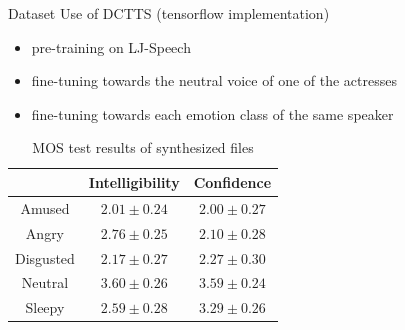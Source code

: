 \documentclass[final]{beamer}
\newlength{\onecolwid}
\newlength{\twocolwid}
\newcommand{\fatskip}{\vspace{3cm}}
\begin{document}
\begin{frame}[t]
\begin{columns}[t]
\begin{column}{\onecolwid}
\begin{block}{Dataset}
Use of DCTTS (tensorflow implementation)
\begin{itemize}
    \item pre-training on LJ-Speech
    \item fine-tuning towards the neutral voice of one of the actresses
    \item fine-tuning towards each emotion class of the same speaker
\end{itemize}



\end{block}




\fatskip\fatskip
\begin{table}[h]

\label{mos_synth}
\begin{center}
\begin{tabular}{|c|c|c|}
\hline
 & Intelligibility & Confidence\\
\hline
Amused & $2.01 \pm 0.24$ & $2.00 \pm 0.27$
\\ 
Angry & $2.76 \pm 0.25$ & $2.10 \pm 0.28$
\\ 
Disgusted & $2.17 \pm 0.27$ & $2.27 \pm 0.30$ 
\\ 
Neutral & $3.60 \pm 0.26$ & $3.59 \pm 0.24$
\\ 
Sleepy & $2.59 \pm 0.28$ & $3.29 \pm 0.26$ 
\\ 


\hline
\end{tabular}
\caption{MOS test results of synthesized files}
\end{center}
\end{table}







\end{column}
\end{columns}
\end{frame}
\end{document}
